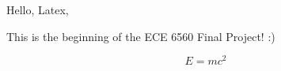 \documentclass{article}
\begin{document}
Hello, Latex,



This is the beginning of the ECE 6560 Final Project! :)

\[
E = mc^2
\]
\end{document}
